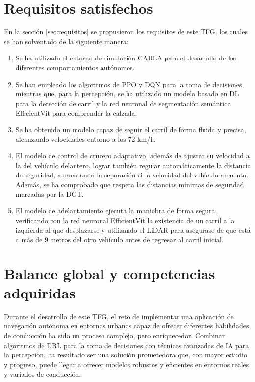 \section{Requisitos satisfechos}

En la sección \ref{sec:requisitos} se propusieron los requisitos de este \ac{TFG}, los cuales se han solventado de la siguiente manera:

\begin{enumerate}
\item Se ha utilizado el entorno de simulación CARLA para el desarrollo de los diferentes comportamientos autónomos.
\item Se han empleado los algoritmos de \ac{PPO} y \ac{DQN} para la toma de decisiones, mientras que, para la percepción, se ha utilizado un modelo basado en \ac{DL} para la detección de carril y la red neuronal de segmentación semántica EfficientVit para comprender la calzada.
\item Se ha obtenido un modelo capaz de seguir el carril de forma fluida y precisa, alcanzando velocidades entorno a los 72 km/h.
\item El modelo de control de crucero adaptativo, además de ajustar su velocidad a la del vehículo delantero, lograr también regular automáticamente la distancia de seguridad, aumentando la separación si la velocidad del vehículo aumenta. Además, se ha comprobado que respeta las distancias mínimas de seguridad marcadas por la \ac{DGT}.
\item El modelo de adelantamiento ejecuta la maniobra de forma segura, verificando con la red neuronal EfficientVit la existencia de un carril a la izquierda al que desplazarse y utilizando el \ac{LiDAR} para asegurase de que está a más de 9 metros del otro vehículo antes de regresar al carril inicial.
\end{enumerate}

\section{Balance global y competencias adquiridas}

Durante el desarrollo de este \ac{TFG}, el reto de implementar una aplicación de navegación autónoma en entornos urbanos capaz de ofrecer diferentes habilidades de conducción ha sido un proceso complejo, pero enriquecedor. Combinar algoritmos de \ac{DRL} para la toma de decisiones con técnicas avanzadas de \ac{IA} para la percepción, ha resultado ser una solución prometedora que, con mayor estudio y progreso, puede llegar a ofrecer modelos robustos y eficientes en entornos reales y variados de conducción.

